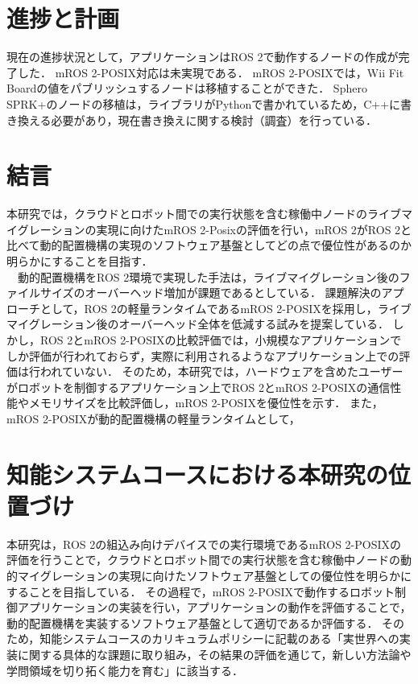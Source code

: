 \documentclass[11pt]{ujarticle}
\begin{document}
\section{進捗と計画}
現在の進捗状況として，アプリケーションはROS 2で動作するノードの作成が完了した．
mROS 2-POSIX対応は未実現である．
mROS 2-POSIXでは，Wii Fit Boardの値をパブリッシュするノードは移植することができた．
Sphero SPRK+のノードの移植は，ライブラリがPythonで書かれているため，C++に書き換える必要があり，現在書き換えに関する検討（調査）を行っている．
\section{結言}
本研究では，クラウドとロボット間での実行状態を含む稼働中ノードのライブマイグレーションの実現に向けたmROS 2-Posixの評価を行い，mROS 2がROS 2と比べて動的配置機構の実現のソフトウェア基盤としてどの点で優位性があるのか明らかにすることを目指す．
\\　動的配置機構をROS 2環境で実現した手法は，ライブマイグレーション後のファイルサイズのオーバーヘッド増加が課題であるとしている．
課題解決のアプローチとして，ROS 2の軽量ランタイムであるmROS 2-POSIXを採用し，ライブマイグレーション後のオーバーヘッド全体を低減する試みを提案している．
しかし，ROS 2とmROS 2-POSIXの比較評価では，小規模なアプリケーションでしか評価が行われておらず，実際に利用されるようなアプリケーション上での評価は行われていない．
そのため，本研究では，ハードウェアを含めたユーザーがロボットを制御するアプリケーション上でROS 2とmROS 2-POSIXの通信性能やメモリサイズを比較評価し，mROS 2-POSIXを優位性を示す．
また，mROS 2-POSIXが動的配置機構の軽量ランタイムとして，

\section{知能システムコースにおける本研究の位置づけ}
本研究は，ROS 2の組込み向けデバイスでの実行環境であるmROS 2-POSIXの評価を行うことで，クラウドとロボット間での実行状態を含む稼働中ノードの動的マイグレーションの実現に向けたソフトウェア基盤としての優位性を明らかにすることを目指している．
その過程で，mROS 2-POSIXで動作するロボット制御アプリケーションの実装を行い，アプリケーションの動作を評価することで，動的配置機構を実装するソフトウェア基盤として適切であるか評価する．
そのため，知能システムコースのカリキュラムポリシーに記載のある「実世界への実装に関する具体的な課題に取り組み，その結果の評価を通じて，新しい方法論や学問領域を切り拓く能力を育む」に該当する．
\end{document}
